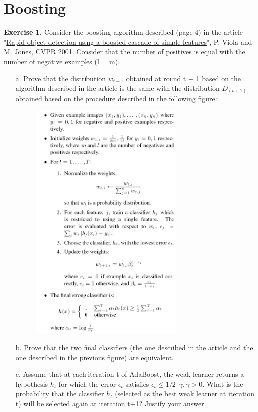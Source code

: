 \documentclass{article}
\newcommand{\<}{\langle}
\renewcommand{\>}{\rangle}
\theoremstyle{definition}
\begin{document}
\newpage

\section{Boosting}

\textbf{Exercise 1.} Consider the boosting algorithm described (page 4) in the article "\href{https://www.cs.cmu.edu/~efros/courses/LBMV07/Papers/viola-cvpr-01.pdf}{Rapid object detection using a boosted cascade of simple features}", P. Viola and M. Jones, CVPR 2001. Consider that the number of positives is equal with the number of negative examples (l = m).

\begin{itemize}
    \item[a.] Prove that the distribution $w_{t+1}$ obtained at round t + 1 based on the algorithm described in the article is the same with the distribution $D_{(t+1)}$ obtained based on the procedure described in the following figure:
    \begin{figure}[h]
        \centering
        \includegraphics[width=7.5cm]{adaboost.png}
    \end{figure}
    \item[b.] Prove that the two final classifiers (the one described in the article and the one described in the previous figure) are equivalent.
    \item[c.] Assume that at each iteration t of AdaBoost, the weak learner returns a hypothesis $h_t$ for which the error $\epsilon_t$ satisfies $\epsilon_t \leq 1/2 – \gamma, \gamma > 0$. What is the probability that the classifier $h_t$ (selected as the best weak learner at iteration t) will be selected again at iteration t+1? Justify your answer.
\end{itemize}
\end{document}
